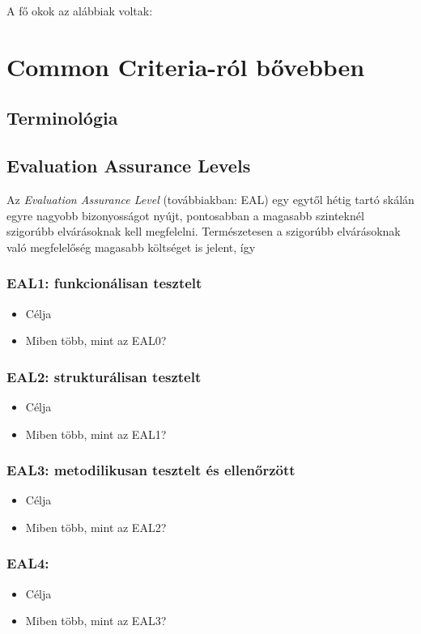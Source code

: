 A fő okok az alábbiak voltak:



\section{Common Criteria-ról bővebben}

\subsection{Terminológia}

\subsection{Evaluation Assurance Levels}

Az \emph{Evaluation Assurance Level} (továbbiakban: EAL) egy egytől hétig tartó skálán egyre nagyobb
bizonyosságot nyújt, pontosabban a magasabb szinteknél szigorúbb elvárásoknak kell megfelelni.
Természetesen a szigorúbb elvárásoknak való megfelelőség magasabb költséget is jelent,
így 

\subsubsection{EAL1: funkcionálisan tesztelt}
\begin{itemize}
    \item{Célja}
    \item{Miben több, mint az EAL0?}
\end{itemize}


\subsubsection{EAL2: strukturálisan tesztelt}
\begin{itemize}
    \item{Célja}
    \item{Miben több, mint az EAL1?}
\end{itemize}
\subsubsection{EAL3: metodilikusan tesztelt és ellenőrzött}
\begin{itemize}
    \item{Célja}
    \item{Miben több, mint az EAL2?}
\end{itemize}
\subsubsection{EAL4: }
\begin{itemize}
    \item{Célja}
    \item{Miben több, mint az EAL3?}
\end{itemize}

